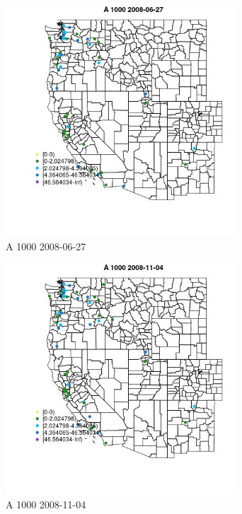 \begin{figure} 
\centering  
\includegraphics[width=0.77\textwidth]{Code_Outputs/Report_ML_input_PM25_Step4_part_e_de_duplicated_aves_MapObsA_10002008-06-27.jpg} 
\caption{\label{fig:Report_ML_input_PM25_Step4_part_e_de_duplicated_avesMapObsA_10002008-06-27}A 1000 2008-06-27} 
\end{figure} 
 

\begin{figure} 
\centering  
\includegraphics[width=0.77\textwidth]{Code_Outputs/Report_ML_input_PM25_Step4_part_e_de_duplicated_aves_MapObsA_10002008-11-04.jpg} 
\caption{\label{fig:Report_ML_input_PM25_Step4_part_e_de_duplicated_avesMapObsA_10002008-11-04}A 1000 2008-11-04} 
\end{figure} 
 

